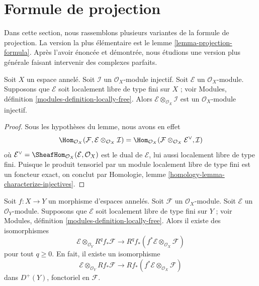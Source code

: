 {\section{Formule de projection}

\label{section-projection-formula}

\noindent
Dans cette section, nous rassemblons plusieurs variantes de la formule de projection. La version la plus élémentaire est le lemme \ref{lemma-projection-formula}. Après l'avoir énoncée et démontrée, nous étudions une version plus générale faisant intervenir des complexes parfaits.

\begin{lemma}

\label{lemma-injective-tensor-finite-locally-free}
Soit $X$ un espace annelé. Soit $\mathcal{I}$ un $\mathcal{O}_X$-module injectif. Soit $\mathcal{E}$ un $\mathcal{O}_X$-module. Supposons que $\mathcal{E}$ soit localement libre de type fini sur $X$ ; voir Modules, définition \ref{modules-definition-locally-free}. Alors $\mathcal{E} \otimes_{\mathcal{O}_X} \mathcal{I}$ est un $\mathcal{O}_X$-module injectif.
\end{lemma}

\begin{proof}
Sous les hypothèses du lemme, nous avons en effet $$
\Hom_{\mathcal{O}_X}(\mathcal{F},
\mathcal{E} \otimes_{\mathcal{O}_X} \mathcal{I})
=
\Hom_{\mathcal{O}_X}(
\mathcal{F} \otimes_{\mathcal{O}_X} \mathcal{E}^\vee, \mathcal{I})
$$ où $\mathcal{E}^\vee = \SheafHom_{\mathcal{O}_X}(\mathcal{E}, \mathcal{O}_X)$ est le dual de $\mathcal{E}$, lui aussi localement libre de type fini. Puisque le produit tensoriel par un module localement libre de type fini est un foncteur exact, on conclut par Homologie, lemme \ref{homology-lemma-characterize-injectives}.
\end{proof}

\begin{lemma}

\label{lemma-projection-formula}
Soit $f : X \to Y$ un morphisme d'espaces annelés. Soit $\mathcal{F}$ un $\mathcal{O}_X$-module. Soit $\mathcal{E}$ un $\mathcal{O}_Y$-module. Supposons que $\mathcal{E}$ soit localement libre de type fini sur $Y$ ; voir Modules, définition \ref{modules-definition-locally-free}. Alors il existe des isomorphismes $$
\mathcal{E} \otimes_{\mathcal{O}_Y} R^qf_*\mathcal{F}
\longrightarrow
R^qf_*(f^*\mathcal{E} \otimes_{\mathcal{O}_X} \mathcal{F})
$$ pour tout $q \geq 0$. En fait, il existe un isomorphisme $$
\mathcal{E} \otimes_{\mathcal{O}_Y} Rf_*\mathcal{F}
\longrightarrow
Rf_*(f^*\mathcal{E} \otimes_{\mathcal{O}_X} \mathcal{F})
$$ dans $D^{+}(Y)$, fonctoriel en $\mathcal{F}$.
\end{lemma}

}
